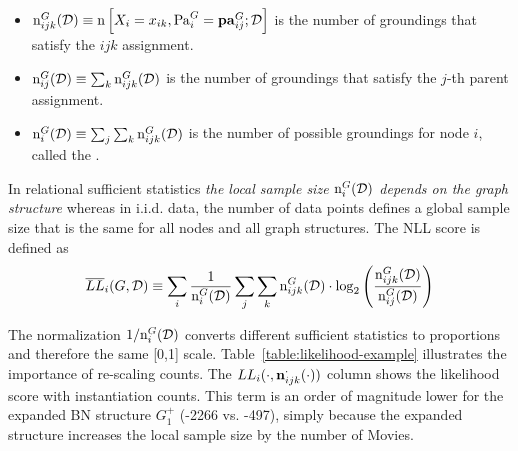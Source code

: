 \documentclass{article}
\begin{document}
\begin{itemize}
\item $\mathrm{n}^{G}_{ijk}(\mathcal{D}) \equiv \mathrm{n}\left[X_{i} = x_{ik},\mathrm{Pa}_{i}^{G}=\mathbf{pa}_{ij}^{G};\mathcal{D}\right]$ is the number of groundings that satisfy the $ijk$ assignment.
\item $\mathrm{n}^{G}_{ij}(\mathcal{D}) \equiv \sum_{k} \mathrm{n}^{G}_{ijk}(\mathcal{D})$ is the number of groundings that satisfy the $j$-th parent assignment.
\item $\mathrm{n}^{G}_{i}(\mathcal{D}) \equiv \sum_{j}\sum_{k} \mathrm{n}^{G}_{ijk}(\mathcal{D})$ is the number of possible groundings for node $i$, called the .
\end{itemize}

In relational sufficient statistics {\em the local sample size  $\mathrm{n}^{G}_{i}(\mathcal{D})$ depends on the graph structure} whereas in i.i.d. data, the number of data points defines a global sample size that is the same for all nodes and all graph structures. The NLL score is defined as
$$
 \overline{LL}_{i}(G,\mathcal{D})
  \equiv  \sum_{i} \frac{1}{\mathrm{n}^{G}_{i}(\mathcal{D})}\sum_{j} \sum_{k} \mathrm{n}^{G}_{ijk}(\mathcal{D}) \cdot 
\log_{2} \left(\frac
{\mathrm{n}^{G}_{ijk}(\mathcal{D})}{\mathrm{n}^{G}_{ij}(\mathcal{D})}\right)
$$

The normalization $1/\mathrm{n}^{G}_{i}(\mathcal{D})$ converts different sufficient statistics to proportions and therefore the same [0,1] scale. 
Table~\ref{table:likelihood-example} illustrates the importance of re-scaling counts. The $LL_{i}(\cdot,\boldsymbol{\mathrm{n}}^{\cdot}_{ijk}(\cdot))$ column shows the likelihood score with instantiation counts. This term is an order of magnitude lower for the expanded BN structure $G_{1}^+$ (-2266 vs. -497),  simply because the expanded structure increases the local sample size by the number of Movies. 
\end{document}
